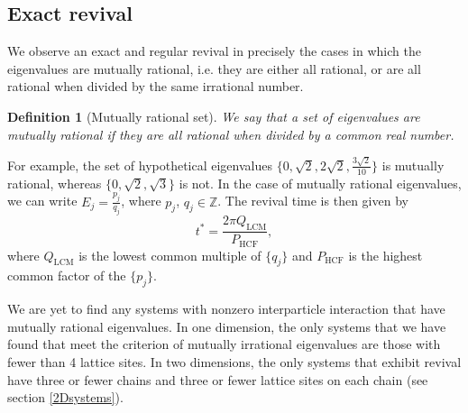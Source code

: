 \documentclass[a4paper, 10pt]{article}
\theoremstyle{plain}
\newtheorem{definition}[]{Definition}
\begin{document}
\subsection{Exact revival}

We observe an exact and regular revival in precisely the cases in which the
eigenvalues are mutually rational, i.e. they are either all rational, or are all
rational when divided by the same irrational number.
\begin{definition}[Mutually rational set]
    We say that a set of eigenvalues are mutually rational if they are all
    rational when divided by a common real number.
\end{definition}
For example, the set of hypothetical eigenvalues $\lbrace 0, \sqrt{2}, 2
\sqrt{2}, \frac{3 \sqrt{2}}{10} \rbrace$ is mutually rational, whereas $\lbrace
0, \sqrt{2}, \sqrt{3}\rbrace$ is not. In the case of mutually rational
eigenvalues, we can write $E_{j} = \frac{p_{j}}{q_{j}}$, where $p_{j}$, $q_{j}
\in \mathbb{Z}$. The revival time is then given by
\begin{equation}
    \label{revival_time_formula}
    t^{\ast} = \frac{2 \pi Q_{\text{LCM}}}{P_{\text{HCF}}},
\end{equation}
where $Q_{\text{LCM}}$ is the lowest common multiple of $\lbrace q_{j} \rbrace$
and $P_{\text{HCF}}$ is the highest common factor of the $\lbrace p_{j} \rbrace$.

We are yet to find any systems with nonzero interparticle interaction that have
mutually rational eigenvalues. In one dimension, the only systems that we have
found that meet the criterion of mutually irrational eigenvalues are those with
fewer than 4 lattice sites. In two dimensions, the only systems that exhibit
revival have three or fewer chains and three or fewer lattice sites on each
chain (see section \ref{2Dsystems}).
\end{document}

